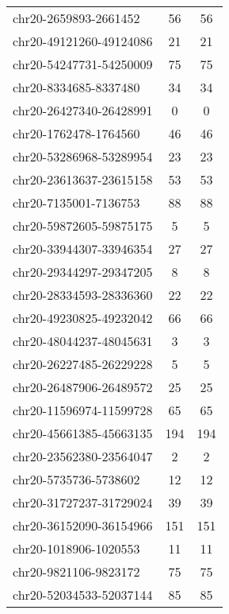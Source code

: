 \documentclass[10pt,letterpaper]{article}
\begin{document}
{\begin{longtable}{lSS}
	chr20-2659893-2661452   & 56     & 56                    \\
	chr20-49121260-49124086 & 21     & 21                    \\
	chr20-54247731-54250009 & 75     & 75                    \\
	chr20-8334685-8337480   & 34     & 34                    \\
	chr20-26427340-26428991 & 0      & 0                     \\
	chr20-1762478-1764560   & 46     & 46                    \\
	chr20-53286968-53289954 & 23     & 23                    \\
	chr20-23613637-23615158 & 53     & 53                    \\
	chr20-7135001-7136753   & 88     & 88                    \\
	chr20-59872605-59875175 & 5      & 5                     \\
	chr20-33944307-33946354 & 27     & 27                    \\
	chr20-29344297-29347205 & 8      & 8                     \\
	chr20-28334593-28336360 & 22     & 22                    \\
	chr20-49230825-49232042 & 66     & 66                    \\
	chr20-48044237-48045631 & 3      & 3                     \\
	chr20-26227485-26229228 & 5      & 5                     \\
	chr20-26487906-26489572 & 25     & 25                    \\
	chr20-11596974-11599728 & 65     & 65                    \\
	chr20-45661385-45663135 & 194    & 194                   \\
	chr20-23562380-23564047 & 2      & 2                     \\
	chr20-5735736-5738602   & 12     & 12                    \\
	chr20-31727237-31729024 & 39     & 39                    \\
	chr20-36152090-36154966 & 151    & 151                   \\
	chr20-1018906-1020553   & 11     & 11                    \\
	chr20-9821106-9823172   & 75     & 75                    \\
	chr20-52034533-52037144 & 85     & 85                    \\

\end{longtable}}
\end{document}
